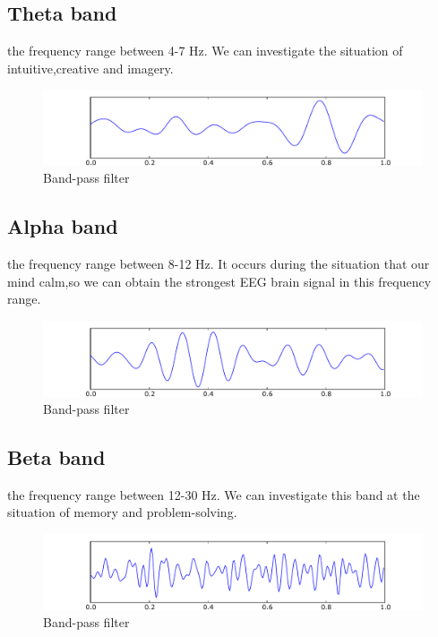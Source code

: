 \subsection{Theta band} the frequency range between 4-7 Hz. We can investigate the situation of intuitive,creative and imagery. 
\begin{figure}[ht]
	\centering
	\includegraphics[scale = 0.14]{chapter3/Eeg_theta.pdf}
	\caption{Band-pass filter}
\end{figure}

\subsection{Alpha band} the frequency range between 8-12 Hz. It occurs during the situation that our mind calm,so we can obtain the strongest EEG brain signal in this frequency range.
\begin{figure}[ht]
	\centering
	\includegraphics[scale = 0.14]{chapter3/Eeg_alpha.pdf}
	\caption{Band-pass filter}
\end{figure}

\subsection{Beta band} the frequency range between 12-30 Hz. We can investigate this band at the situation of memory and problem-solving.
\begin{figure}[ht]
	\centering
	\includegraphics[scale = 0.14]{chapter3/Eeg_beta.pdf}
	\caption{Band-pass filter}
\end{figure}

